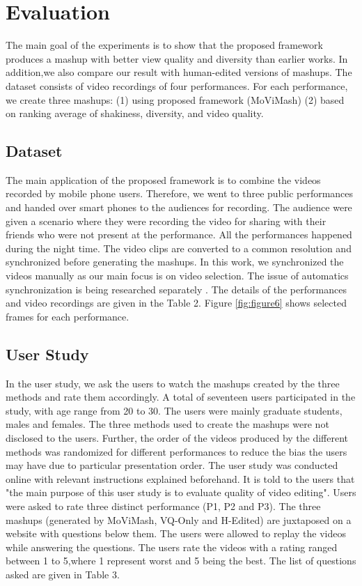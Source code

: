 \documentclass{sig-alternate}
\begin{document}
\section{Evaluation}
The main goal of the experiments is to show that the proposed framework produces a mashup with better view quality and diversity than earlier works. In addition,we also compare our result with human-edited versions of mashups. The dataset consists of video recordings of four performances. For each performance, we create three mashups: (1) using proposed framework (MoViMash) (2) based on ranking average of shakiness, diversity, and video quality.

\subsection{Dataset}
The main application of the proposed framework is to combine the videos recorded by mobile phone users. Therefore, we went to three public performances and handed over smart phones to the audiences for recording. The audience were given a scenario where they were recording the video for sharing with their friends who were not present at the performance. All the performances happened during the night time. The video clips are converted to a common resolution and synchronized before generating the mashups. In this work, we synchronized the videos manually as our main focus is on video selection. The issue of automatics synchronization is being researched separately \cite{frakes1992information}. The details of the performances and video recordings are given in the Table 2. Figure \ref{fig:figure6} shows selected frames for each performance.

\subsection{User Study}
 In the user study, we ask the users to watch the mashups created by the three methods and rate them accordingly. A total of seventeen users participated in the study, with age range from 20 to 30. The users were mainly graduate students, males and females. The three methods used to create the mashups were not disclosed to the users. Further, the order of the videos produced by the different methods was randomized for different performances to reduce the bias the users may have due to particular presentation order. The user study was conducted online with relevant instructions explained beforehand. It is told to the users that "the main purpose of this user study is to evaluate quality of video editing". Users were asked to rate three distinct performance (P1, P2 and P3). The three mashups (generated by MoViMash, VQ-Only and H-Edited) are juxtaposed on a website with questions below them. The users were allowed to replay the videos while answering the questions. The users rate the videos with a rating ranged between 1 to 5,where 1 represent worst and 5 being the best. The list of questions asked are given in Table 3. 
\end{document}
